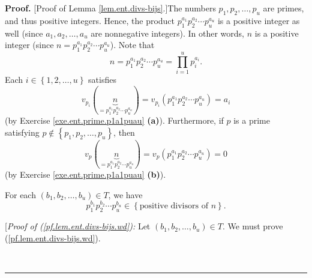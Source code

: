 \documentclass[numbers=enddot,12pt,final,onecolumn,notitlepage]{scrartcl}%
\numberwithin{exer}{subsection}
\theoremstyle{definition}
\newenvironment{fineprint}{\begin{small}}{\end{small}}
\newenvironment{proof}[1][Proof]{\noindent\textbf{#1.} }{\ \rule{0.5em}{0.5em}}
\let\prodnonlimits\prod
\renewcommand{\prod}{\prodnonlimits\limits}
\begin{document}
\begin{proof}
[Proof of Lemma \ref{lem.ent.divs-bijs}.]The numbers $p_{1},p_{2},\ldots
,p_{u}$ are primes, and thus positive integers. Hence, the product
$p_{1}^{a_{1}}p_{2}^{a_{2}}\cdots p_{u}^{a_{u}}$ is a positive integer as well
(since $a_{1},a_{2},\ldots,a_{u}$ are nonnegative integers). In other words,
$n$ is a positive integer (since $n=p_{1}^{a_{1}}p_{2}^{a_{2}}\cdots
p_{u}^{a_{u}}$). Note that%
\[
n=p_{1}^{a_{1}}p_{2}^{a_{2}}\cdots p_{u}^{a_{u}}=\prod_{i=1}^{u}p_{i}^{a_{i}%
}.
\]
Each $i\in\left\{  1,2,\ldots,u\right\}  $ satisfies%
\begin{equation}
v_{p_{i}}\left(  \underbrace{n}_{=p_{1}^{a_{1}}p_{2}^{a_{2}}\cdots
p_{u}^{a_{u}}}\right)  =v_{p_{i}}\left(  p_{1}^{a_{1}}p_{2}^{a_{2}}\cdots
p_{u}^{a_{u}}\right)  =a_{i} \label{pf.lem.ent.divs-bijs.vpi}%
\end{equation}
(by Exercise \ref{exe.ent.prime.p1a1puau} \textbf{(a)}). Furthermore, if $p$
is a prime satisfying $p\notin\left\{  p_{1},p_{2},\ldots,p_{u}\right\}  $,
then%
\begin{equation}
v_{p}\left(  \underbrace{n}_{=p_{1}^{a_{1}}p_{2}^{a_{2}}\cdots p_{u}^{a_{u}}%
}\right)  =v_{p}\left(  p_{1}^{a_{1}}p_{2}^{a_{2}}\cdots p_{u}^{a_{u}}\right)
=0 \label{pf.lem.ent.divs-bijs.vp}%
\end{equation}
(by Exercise \ref{exe.ent.prime.p1a1puau} \textbf{(b)}).

For each $\left(  b_{1},b_{2},\ldots,b_{u}\right)  \in T$, we have%
\begin{equation}
p_{1}^{b_{1}}p_{2}^{b_{2}}\cdots p_{u}^{b_{u}}\in\left\{  \text{positive
divisors of }n\right\}  . \label{pf.lem.ent.divs-bijs.wd}%
\end{equation}


\begin{fineprint}
[\textit{Proof of (\ref{pf.lem.ent.divs-bijs.wd}):} Let $\left(  b_{1}%
,b_{2},\ldots,b_{u}\right)  \in T$. We must prove
(\ref{pf.lem.ent.divs-bijs.wd}).


\end{fineprint}
\end{proof}
\end{document}
